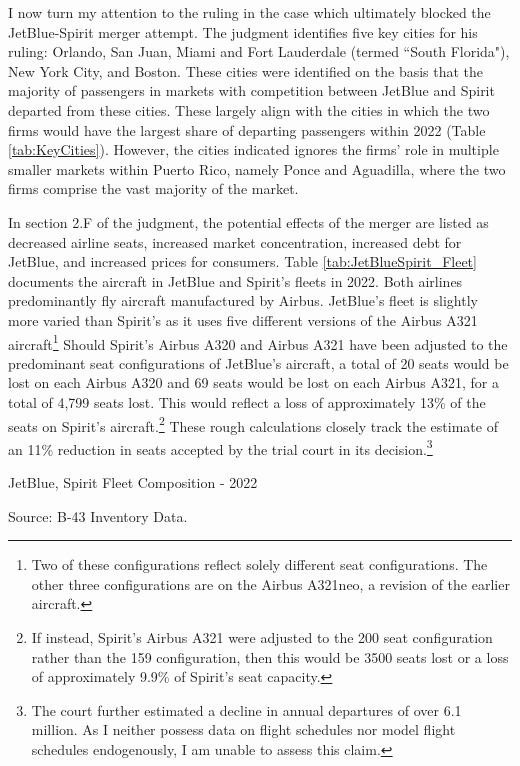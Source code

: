 \documentclass{article}
\begin{document}
	I now turn my attention to the ruling in the case \citep{william_g_young_findings_2024} which ultimately blocked the JetBlue-Spirit merger attempt. The judgment identifies five key cities for his ruling: Orlando, San Juan, Miami and Fort Lauderdale (termed ``South Florida"), New York City, and Boston. These cities were identified on the basis that the majority of passengers in markets with competition between JetBlue and Spirit departed from these cities. These largely align with the cities in which the two firms would have the largest share of departing passengers within 2022 (Table \ref{tab:KeyCities}). However, the cities indicated ignores the firms' role in multiple smaller markets within Puerto Rico, namely Ponce and Aguadilla, where the two firms comprise the vast majority of the market. 
	
	In section 2.F of the judgment, the potential effects of the merger are listed as decreased airline seats, increased market concentration, increased debt for JetBlue, and increased prices for consumers. Table \ref{tab:JetBlueSpirit_Fleet} documents the aircraft in JetBlue and Spirit's fleets in 2022. Both airlines predominantly fly aircraft manufactured by Airbus. JetBlue's fleet is slightly more varied than Spirit's as it uses five different versions of the Airbus A321 aircraft\footnote{Two of these configurations reflect solely different seat configurations. The other three configurations are on the Airbus A321neo, a revision of the earlier aircraft.} Should Spirit's Airbus A320 and Airbus A321 have been adjusted to the predominant seat configurations of JetBlue's aircraft, a total of 20 seats would be lost on each Airbus A320 and 69 seats would be lost on each Airbus A321, for a total of 4,799 seats lost. This would reflect a loss of approximately 13\% of the seats on Spirit's aircraft.\footnote{If instead, Spirit's Airbus A321 were adjusted to the 200 seat configuration rather than the 159 configuration, then this would be 3500 seats lost or a loss of approximately 9.9\% of Spirit's seat capacity.} These rough calculations closely track the estimate of an 11\% reduction in seats accepted by the trial court in its decision.\footnote{The court further estimated a decline in annual departures of over 6.1 million. As I neither possess data on flight schedules nor model flight schedules endogenously, I am unable to assess this claim.} 
    
    \begin{table}
        \begin{center}
            \caption{JetBlue, Spirit Fleet Composition - 2022}
            \label{tab:JetBlueSpirit_Fleet}
            \vspace{-10mm}
          
        \end{center}
        \footnotesize{Source: B-43 Inventory Data.}
    \end{table}
\end{document}
